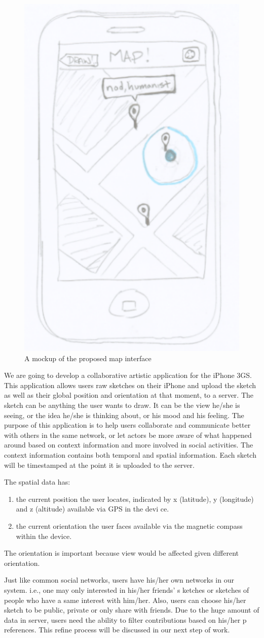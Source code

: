 \documentclass{article}
\begin{document}
\begin{figure}
\centering
\includegraphics[width=.35\textwidth]{map.pdf}
\caption{A mockup of the proposed map interface}
\label{fig:map}
\end{figure}

We are going to develop a collaborative artistic application for the iPhone 3GS. This application allows users raw sketches on their iPhone and upload the sketch as well as their global position and orientation at that moment, to a server. The sketch can be anything the user wants to draw. It can be the view he/she is seeing, or the idea he/she is thinking about, or his mood and his feeling. The purpose of this application is to help users collaborate and communicate better with others in the same network, or let actors be more aware of what happened around based on context information and more involved in social activities. The context information contains both temporal and spatial information. Each sketch will be timestamped at the point it is uploaded to the server.

The spatial data has:
\begin{enumerate}
\item the current position the user locates, indicated by x (latitude), y (longitude) and z (altitude) available via GPS in the devi
ce.
\item the current orientation the user faces available via the magnetic compass within the device.
\end{enumerate}
The orientation is important because view would be affected given different orientation.

Just like common social networks, users have his/her own networks in our system. i.e., one may only interested in his/her friends' s
ketches or sketches of people who have a same interest with him/her. Also, users can choose his/her sketch to be public, private or 
only share with friends. Due to the huge amount of data in server, users need the ability to filter contributions based on his/her p
references. This refine process will be discussed in our next step of work.
\end{document}
